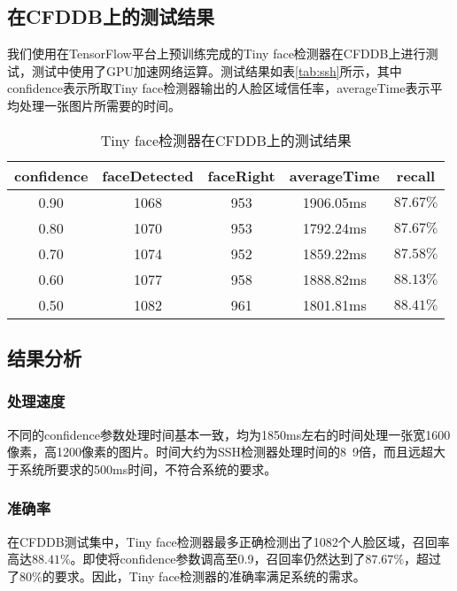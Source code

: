 \subsection{在CFDDB上的测试结果}
\label{chap2:tinyresult}

我们使用在TensorFlow平台上预训练完成的Tiny face检测器在CFDDB上进行测试，测试中使用了GPU加速网络运算。测试结果如表\ref{tab:ssh}所示，其中confidence表示所取Tiny face检测器输出的人脸区域信任率，averageTime表示平均处理一张图片所需要的时间。

\begin{table}[!hpb]
	\centering
	\caption{Tiny face检测器在CFDDB上的测试结果}
	\label{tab:tiny}
	\begin{tabular}{ cccc | c }
		\hline
		confidence & faceDetected & faceRight & averageTime & recall\\
		\hline
		0.90 & 1068 & 953 & 1906.05ms & $87.67\%$\\
		0.80 & 1070 & 953 & 1792.24ms & $87.67\%$\\
		0.70 & 1074 & 952 & 1859.22ms & $87.58\%$\\
		0.60 & 1077 & 958 & 1888.82ms & $88.13\%$\\
		0.50 & 1082 & 961 & 1801.81ms & $88.41\%$\\
		\hline
	\end{tabular}
\end{table}

\subsection{结果分析}

\subsubsection{处理速度}

不同的confidence参数处理时间基本一致，均为1850ms左右的时间处理一张宽1600像素，高1200像素的图片。时间大约为SSH检测器处理时间的8~9倍，而且远超大于系统所要求的500ms时间，不符合系统的要求。

\subsubsection{准确率}

在CFDDB测试集中，Tiny face检测器最多正确检测出了1082个人脸区域，召回率高达$88.41\%$。即使将confidence参数调高至0.9，召回率仍然达到了$87.67\%$，超过了$80\%$的要求。因此，Tiny face检测器的准确率满足系统的需求。

